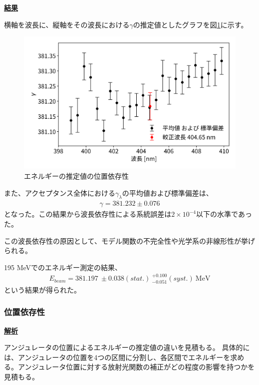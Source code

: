 \documentclass[a4paper,11pt,uplatex]{jsbook}
\begin{document}
\noindent \textbf{\underline{結果}}\par
横軸を波長に、縦軸をその波長における$\gamma$の推定値としたグラフを図\ref{wldep}に示す。
\begin{figure}[h]
  \centering
  \includegraphics[width=0.8\linewidth]{image/4-wldep.png}
  \caption{エネルギーの推定値の位置依存性}\label{wldep}
\end{figure}

また、アクセプタンス全体における$\gamma_\lambda$の平均値および標準偏差は、
\begin{eqnarray}
  \gamma = 381.232 \pm 0.076
\end{eqnarray}
となった。この結果から波長依存性による系統誤差は$2\times10^{-4}$以下の水準であった。

この波長依存性の原因として、モデル関数の不完全性や光学系の非線形性が挙げられる。

195 MeVでのエネルギー測定の結果、
\begin{align}
  E_{beam} = 381.197 ~\pm 0.038(stat.) ~^{+0.100}_{-0.051}(syst.)~\text{MeV}
\end{align}
という結果が得られた。

\subsubsection{位置依存性}
\noindent \textbf{\underline{解析}}\par
アンジュレータの位置によるエネルギーの推定値の違いを見積もる。
具体的には、アンジュレータの位置を4つの区間に分割し、各区間でエネルギーを求める。アンジュレータ位置に対する放射光関数の補正がどの程度の影響を持つかを見積もる。
\end{document}
